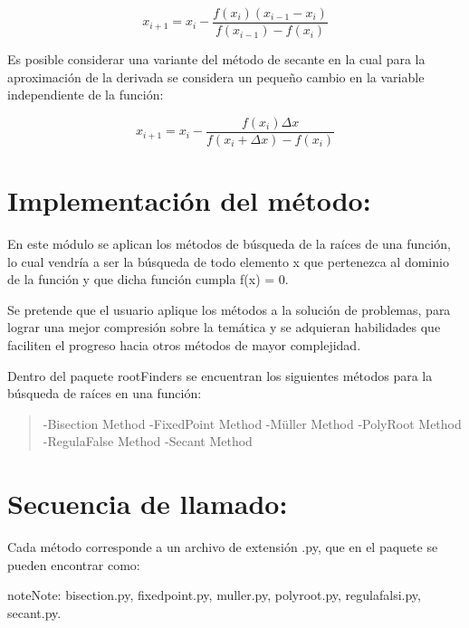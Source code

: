 \documentclass[letterpaper,10pt,oneside]{sphinxmanual}
\theoremstyle{plain}%
\theoremstyle{definition}%
\theoremstyle{remark}%
\begin{document}
\begin{equation}
 x_{i+1}=x_{i}-\frac{f(x_{i})(x_{i-1}-x_{i})}{f(x_{i-1})-f(x_{i})} \label{secante}
\end{equation}

\noindent Es posible considerar una variante del método de secante en la cual para la aproximación de la derivada se considera un pequeño cambio en la variable independiente de la función:\medskip

\begin{equation}
x_{i+1}=x_{i}-\frac{f(x_{i})\Delta x}{f(x_{i}+\Delta x)-f(x_{i})} \label{secantem}
\end{equation}


\section{Implementación del método:}
\label{chapter01:descripcion-del-metodo}

\noindent En este módulo se aplican los métodos de búsqueda de la raíces de una función, lo cual vendría a ser la búsqueda de todo elemento x que pertenezca al dominio de la función y que dicha función  cumpla f(x) = 0.\medskip

\noindent Se pretende que el usuario aplique los métodos a la solución de problemas, para lograr una mejor compresión sobre la temática y se adquieran habilidades que faciliten el progreso hacia otros métodos de mayor complejidad.\medskip

Dentro del paquete rootFinders se encuentran los siguientes métodos para la búsqueda de raíces en una función:
\begin{quote}

-Bisection Method
-FixedPoint Method
-Müller Method
-PolyRoot Method
-RegulaFalse Method
-Secant Method
\end{quote}

\section{Secuencia de llamado:}
\label{chapter01:sequencia-de-llamado}

\noindent Cada método corresponde a un archivo de extensión .py, que en el paquete se pueden encontrar como:\medskip

\begin{notice}{note}{Note:}
bisection.py, fixedpoint.py, muller.py, polyroot.py, regulafalsi.py, secant.py.
\end{notice}
\end{document}
